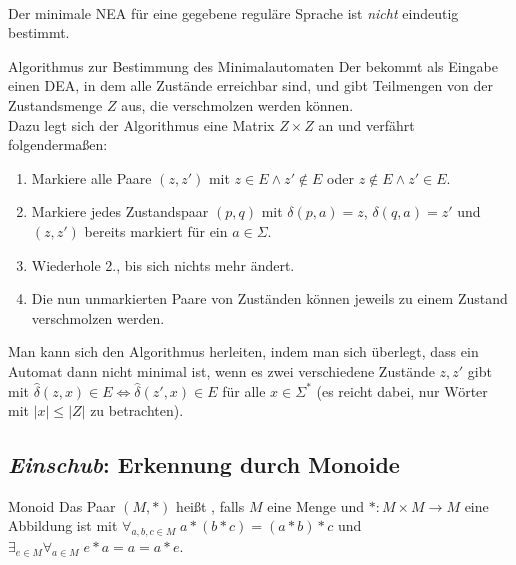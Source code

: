 \begin{Bem}\\
    Der minimale NEA für eine gegebene reguläre Sprache ist \emph{nicht}
    eindeutig bestimmt.
\end{Bem}

\linie

\begin{Def}{Algorithmus zur Bestimmung des Minimalautomaten}
    Der  bekommt
    als Eingabe einen DEA, in dem alle Zustände erreichbar sind, und
    gibt Teilmengen von der Zustandsmenge $Z$ aus, die verschmolzen werden
    können.\\
    Dazu legt sich der Algorithmus eine Matrix $Z \times Z$ an und
    verfährt folgendermaßen:
    \begin{enumerate}
        \item
        Markiere alle Paare $(z, z')$ mit $z \in E \land z' \notin E$ oder
        $z \notin E \land z' \in E$.

        \item
        Markiere jedes Zustandspaar $(p, q)$ mit $\delta(p, a) = z$,
        $\delta(q, a) = z'$ und $(z, z')$ bereits markiert für ein
        $a \in \Sigma$.

        \item
        Wiederhole 2., bis sich nichts mehr ändert.

        \item
        Die nun unmarkierten Paare von Zuständen können jeweils zu einem
        Zustand verschmolzen werden.
    \end{enumerate}
\end{Def}

\begin{Bem}
    Man kann sich den Algorithmus herleiten, indem man sich überlegt, dass
    ein Automat dann nicht minimal ist, wenn es zwei verschiedene Zustände
    $z, z'$ gibt mit $\widehat{\delta}(z, x) \in E \iff
    \widehat{\delta}(z', x) \in E$ für alle $x \in \Sigma^\ast$
    (es reicht dabei, nur Wörter mit $|x| \le |Z|$ zu betrachten).
\end{Bem}

\pagebreak

\subsection{%
    \emph{Einschub}: Erkennung durch Monoide%
}

\begin{Def}{Monoid}
    Das Paar $(M, \ast)$ heißt , falls
    $M$ eine Menge und
    $\ast\colon M \times M \rightarrow M$ eine Abbildung ist mit
    $\forall_{a, b, c \in M}\;
    a \ast (b \ast c) = (a \ast b) \ast c$ und
    $\exists_{e \in M} \forall_{a \in M}\; e \ast a = a = a \ast e$.
\end{Def}

